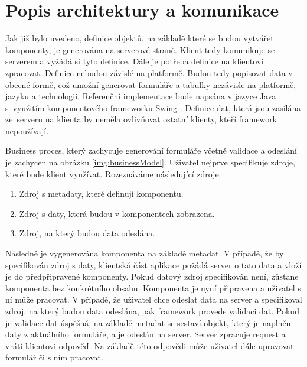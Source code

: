 \section{Popis architektury a komunikace}
Jak již bylo uvedeno, definice objektů, na základě které se budou vytvářet komponenty, je generována na serverové straně. Klient tedy komunikuje se serverem a vyžádá si tyto definice. Dále je potřeba definice na klientovi zpracovat. Definice nebudou závislé na platformě. Budou tedy popisovat data v obecné formě, což umožní generovat formuláře a tabulky nezávisle na platformě, jazyku a technologii. Referenční implementace bude napsána v jazyce Java s~využitím komponentového frameworku Swing \cite{swing}. Definice dat, která jsou zasílána ze~serveru na klienta by neměla ovlivňovat ostatní klienty, kteří framework nepoužívají. 

Business proces, který zachycuje generování formuláře včetně validace a odeslání je zachycen na obrázku \ref{img:businessModel}. Uživatel nejprve specifikuje zdroje, které bude klient využívat. Rozeznáváme následující zdroje:
\begin{enumerate}
\item Zdroj s metadaty, které definují komponentu.
\item Zdroj s daty, která budou v komponentech zobrazena.
\item Zdroj, na který budou data odeslána.
\end{enumerate}
Následně je vygenerována komponenta na základě metadat. V případě, že byl specifikován zdroj s daty, klientská část aplikace požádá server o tato data a vloží je do předpřipravené komponenty. Pokud datový zdroj specifikován není, zůstane komponenta bez konkrétního obsahu. Komponenta je nyní připravena a uživatel s ní může pracovat. V případě, že uživatel chce odeslat data na server a specifikoval zdroj, na který budou data odeslána, pak framework provede validaci dat. Pokud je validace dat úspěšná, na základě metadat se sestaví objekt, který je naplněn daty z aktuálního formuláře, a je odeslán na server. Server zpracuje request a vrátí klientovi odpověď. Na základě této odpovědi může uživatel dále upravovat formulář či s ním pracovat.


